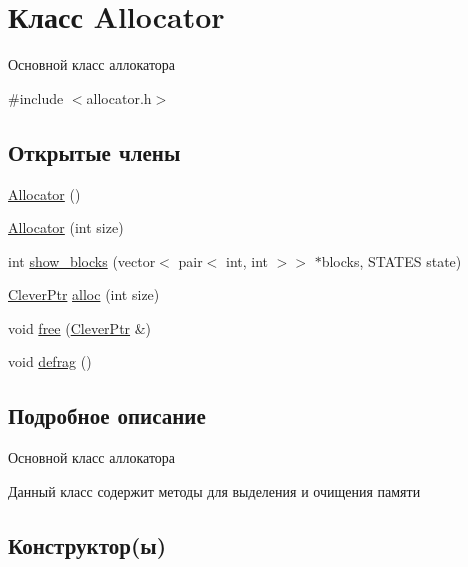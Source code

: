 \hypertarget{class_allocator}{}\section{Класс Allocator}
\label{class_allocator}


Основной класс аллокатора  




{\ttfamily \#include $<$allocator.\+h$>$}

\subsection*{Открытые члены}
\begin{DoxyCompactItemize}
\item 
\mbox{\hyperlink{class_allocator_acd81cd6a9337a081c558f89661b623d7}{Allocator}} ()
\item 
\mbox{\hyperlink{class_allocator_af37df7ff59070823ef0e9796bea63518}{Allocator}} (int size)
\item 
int \mbox{\hyperlink{class_allocator_ad92f0001258aa05d43ab4f242807c332}{show\+\_\+blocks}} (vector$<$ pair$<$ int, int $>$$>$ $\ast$blocks, S\+T\+A\+T\+ES state)
\item 
\mbox{\hyperlink{class_clever_ptr}{Clever\+Ptr}} \mbox{\hyperlink{class_allocator_afaa7d76d46c8393ccf5a9fb0ba8d0c2f}{alloc}} (int size)
\item 
void \mbox{\hyperlink{class_allocator_a847a42083e25740ad283e2ffed2b294c}{free}} (\mbox{\hyperlink{class_clever_ptr}{Clever\+Ptr}} \&)
\item 
void \mbox{\hyperlink{class_allocator_ae5eaf0539035654ca8e5abc6586326f3}{defrag}} ()
\end{DoxyCompactItemize}


\subsection{Подробное описание}
Основной класс аллокатора 

Данный класс содержит методы для выделения и очищения памяти 

\subsection{Конструктор(ы)}
\mbox{\label{class_allocator_acd81cd6a9337a081c558f89661b623d7}} 
